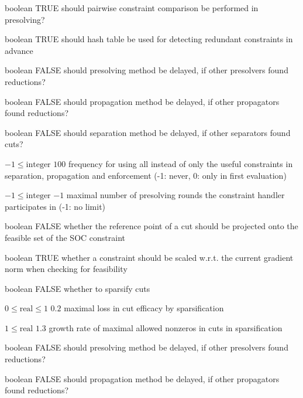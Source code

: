 %
{boolean}%
{TRUE}%
{should pairwise constraint comparison be performed in presolving?}%
{}

%
{boolean}%
{TRUE}%
{should hash table be used for detecting redundant constraints in advance}%
{}

%
{boolean}%
{FALSE}%
{should presolving method be delayed, if other presolvers found reductions?}%
{}

%
{boolean}%
{FALSE}%
{should propagation method be delayed, if other propagators found reductions?}%
{}

%
{boolean}%
{FALSE}%
{should separation method be delayed, if other separators found cuts?}%
{}

%
{$-1\leq\textrm{integer}$}%
{$100$}%
{frequency for using all instead of only the useful constraints in separation, propagation and enforcement (-1: never, 0: only in first evaluation)}%
{}

%
{$-1\leq\textrm{integer}$}%
{$-1$}%
{maximal number of presolving rounds the constraint handler participates in (-1: no limit)}%
{}

%
{boolean}%
{FALSE}%
{whether the reference point of a cut should be projected onto the feasible set of the SOC constraint}%
{}

%
{boolean}%
{TRUE}%
{whether a constraint should be scaled w.r.t. the current gradient norm when checking for feasibility}%
{}

%
{boolean}%
{FALSE}%
{whether to sparsify cuts}%
{}

%
{$0\leq\textrm{real}\leq1$}%
{$0.2$}%
{maximal loss in cut efficacy by sparsification}%
{}

%
{$1\leq\textrm{real}$}%
{$1.3$}%
{growth rate of maximal allowed nonzeros in cuts in sparsification}%
{}

%
{boolean}%
{FALSE}%
{should presolving method be delayed, if other presolvers found reductions?}%
{}

%
{boolean}%
{FALSE}%
{should propagation method be delayed, if other propagators found reductions?}%
{}

